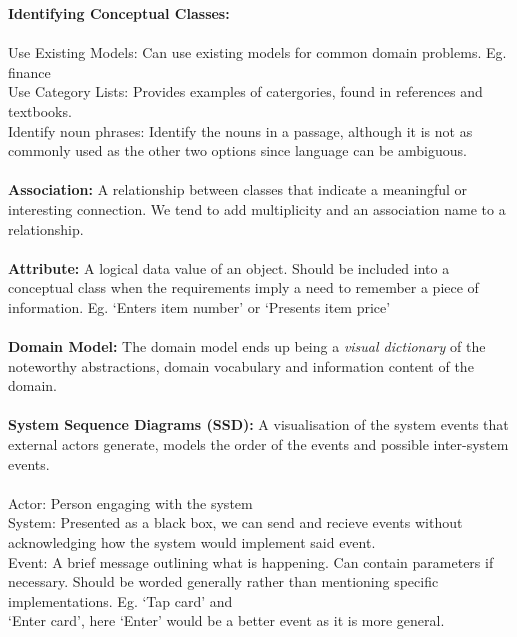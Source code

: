 \documentclass[a4paper,10pt]{article}
\begin{document}
\textcolor{Emerald}{\textbf{Identifying Conceptual Classes:}}\\\\
\indent \textcolor{Emerald}{Use Existing Models:} Can use existing models for common domain problems. Eg. finance\\
\indent \textcolor{Emerald}{Use Category Lists:} Provides examples of catergories, found in references and textbooks. \\
\indent \textcolor{Emerald}{Identify noun phrases:} Identify the nouns in a passage, although it is not as commonly used as the \indent other two options since language can be ambiguous.\\ \\
\textcolor{Emerald}{\textbf{Association:}} A relationship between classes that indicate a meaningful or interesting connection. We tend to add multiplicity and an association name to a relationship.\\\\
\textcolor{Emerald}{\textbf{Attribute:}} A logical data value of an object. Should be included into a conceptual class when the requirements imply a need to remember a piece of information. Eg. `Enters item number' or `Presents item price'\\\\
\textcolor{Emerald}{\textbf{Domain Model:}} The domain model ends up being a \emph{visual dictionary} of the noteworthy abstractions, domain vocabulary and information content of the domain.\\\\
\textcolor{Emerald}{\textbf{System Sequence Diagrams (SSD):}} A visualisation of the system events that external actors generate, models the order of the events and possible inter-system events.\\\\
\indent \textcolor{Emerald}{Actor:} Person engaging with the system \\ 
\indent \textcolor{Emerald}{System:} Presented as a black box, we can send and recieve events without acknowledging how the \indent system would implement said event.  \\
\indent \textcolor{Emerald}{Event:} A brief message outlining what is happening. Can contain parameters if necessary. Should \indent be worded generally rather than mentioning specific implementations. Eg. `Tap card' and \\
\indent`Enter card', here `Enter' would be a better event as it is more general. \\
\end{document}
